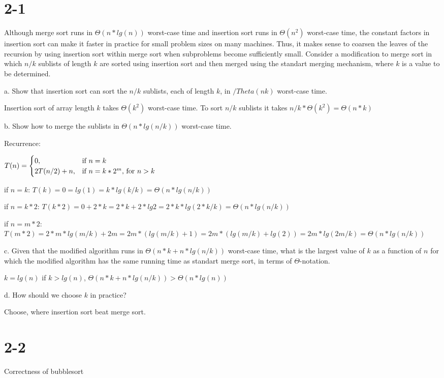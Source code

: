 \documentclass{article}
\begin{document}
\section{2-1}
Although merge sort runs in $\Theta(n*lg(n))$ worst-case time and insertion sort runs in $\Theta(n^2)$ worst-case time, the constant factors in insertion sort can make it faster in practice for small problem sizes on many machines. Thus, it makes sense to coarsen the leaves of the recursion by using insertion sort within merge sort when subproblems become sufficiently small. Consider a modification to merge sort in which $n/k$ sublists of length $k$ are sorted using insertion sort and then merged using the standart merging mechanism, where $k$ is a value to be determined.

a. Show that insertion sort can sort the $n/k$ sublists, each of length $k$, in $/Theta(nk)$ worst-case time.


Insertion sort of array length $k$ takes $\Theta(k^2)$ worst-case time.  To sort $n/k$ sublists it takes $n/k*\Theta(k^2) = \Theta(n*k)$ 


b. Show how to merge the sublists in $\Theta(n*lg(n/k))$ worst-case time.

Recurrence:

 $T(n) = 
\begin{cases}
 0, & \mbox{if  $n= k$} \\
 2T(n/2)+n, & \mbox{if $ n=k*2^m$, for $n > k$} 
\end{cases}$ 

if $n=k$: $T(k)=0=lg(1)=k*lg(k/k) = \Theta(n*lg(n/k))$


if $n=k*2$: $T(k*2)=0+2*k= 2*k +2*lg2 = 2*k*lg(2*k/k) = \Theta(n*lg(n/k))$


if $n=m*2$: $T(m*2) = 2*m*lg(m/k)+2m=2m*(lg(m/k)+1)=2m*(lg(m/k)+lg(2))=2m*lg(2m/k)= \Theta(n*lg(n/k))$

c. Given that the modified algorithm runs in $\Theta(n*k + n*lg(n/k))$ worst-case time, what is the largest value of $k$ as a function of $n$ for which the modified algorithm has the same running time as standart merge sort, in terms of $\Theta$-notation.

$k=lg(n)$
if $k>lg(n)$,  $\Theta(n*k + n*lg(n/k)) > \Theta( n*lg(n))$

d. How should we choose $k$ in practice?

Choose, where insertion sort beat merge sort.

\section{2-2}
Correctness of bubblesort
\end{document}
